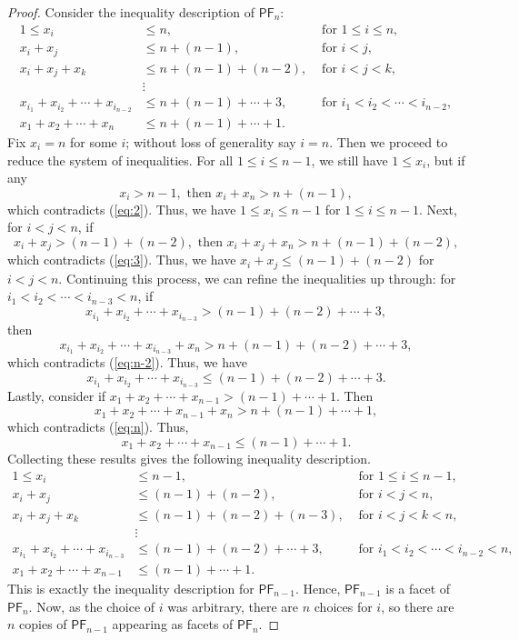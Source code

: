 \documentclass[10pt,a4paper]{amsart}
\newcommand{\PF}{\mathsf{PF}}
\begin{document}
\begin{proof}
Consider the inequality description of $\PF_n$:
\begin{align}
    1 \leq x_i &\leq n, &\text{ for } 1 \leq i \leq n,\label{eq:1}\\
    x_i+x_j &\leq n + (n-1), &\text{ for } i < j,\label{eq:2}\\
    x_i+x_j+x_k &\leq n + (n-1) + (n-2), &\text{ for } i < j < k,\label{eq:3}\\
    &\vdots\nonumber\\
    x_{i_1}+ x_{i_2}+ \cdots + x_{i_{n-2}} &\leq n + (n-1) + \cdots + 3, &\text{ for } i_1 < i_2 < \cdots < i_{n-2},\label{eq:n-2}\\
    x_{1}+ x_{2}+ \cdots + x_{n} &\leq n + (n-1) + \cdots + 1.\label{eq:n}
\end{align}
Fix $x_i = n$ for some $i$; without loss of generality say $i=n$. 
Then we proceed to reduce the system of inequalities.
For all $1 \leq i \leq n-1$, we still have $1 \leq x_i$, but if any \[x_i > n - 1, \text{ then } x_i + x_n >  n + (n-1),\] which contradicts (\ref{eq:2}).
Thus, we have $1 \leq x_i \leq n-1$ for $1 \leq i \leq n-1$. 
Next, for $i < j < n$, if \[x_i + x_j > (n-1) + (n-2), \text{ then } x_i + x_j + x_n > n + (n-1) + (n-2),\] which contradicts (\ref{eq:3}). 
Thus, we have $x_i + x_j \leq (n-1) + (n-2)$ for $i < j < n$. 
Continuing this process, we can refine the inequalities up through: for $i_1 < i_2 < \cdots < i_{n-3} < n$, if \[x_{i_1} + x_{i_2} + \cdots + x_{i_{n-3}} > (n-1) + (n-2) + \cdots + 3,\] then \[x_{i_1} + x_{i_2} + \cdots + x_{i_{n-3}} + x_n > n + (n-1) + (n-2) + \cdots +3,\] which contradicts (\ref{eq:n-2}). 
Thus, we have \[x_{i_1} + x_{i_2} + \cdots + x_{i_{n-3}} \leq (n-1) + (n-2) + \cdots + 3.\] 
Lastly, consider if $x_1 + x_2 + \cdots + x_{n-1} > (n-1) + \cdots +1$. 
Then \[x_1 + x_2 + \cdots + x_{n-1} + x_n >  n+ (n-1) + \cdots +1,\] which contradicts (\ref{eq:n}). 
Thus, \[x_1 + x_2 + \cdots + x_{n-1} \leq (n-1) + \cdots +1.\]
Collecting these results gives the following inequality description.
\begin{align*}
    1 \leq x_i &\leq n-1, &\text{ for } 1 \leq i \leq n-1,\\
    x_i+x_j &\leq (n-1) + (n-2), &\text{ for } i < j < n,\\
    x_i+x_j+x_k &\leq (n-1) + (n-2) + (n-3), &\text{ for } i < j < k < n,\\
    &\vdots\\
    x_{i_1}+ x_{i_2}+ \cdots + x_{i_{n-3}} &\leq (n-1) + (n-2) + \cdots + 3, &\text{ for } i_1 < i_2 < \cdots < i_{n-2} < n,\\
    x_{1}+ x_{2}+ \cdots + x_{n-1} &\leq  (n-1) + \cdots + 1.
\end{align*}
This is exactly the inequality description for $\PF_{n-1}$. 
Hence, $\PF_{n-1}$ is a facet of $\PF_n$.
Now, as the choice of $i$ was arbitrary, there are $n$ choices for $i$, so there are $n$ copies of $\PF_{n-1}$ appearing as facets of $\PF_n$. 


\end{proof}
\end{document}
